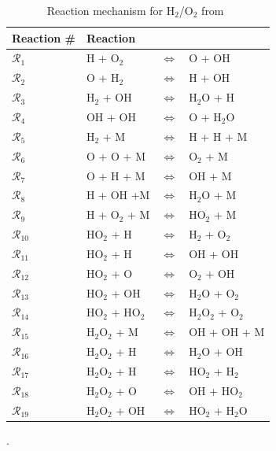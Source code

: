 \begin{table}[htbp]
\renewcommand*{\arraystretch}{1.2}
\begin{center}
\begin{tabular}{llll}
\toprule
Reaction \#     & Reaction &&\\
\bottomrule
$\mathcal{R}_1$ & H + O$_2$          & $\Longleftrightarrow$ & O + OH \\
$\mathcal{R}_2$ & O + H$_2$          & $\Longleftrightarrow$ & H + OH \\
$\mathcal{R}_3$ & H$_2$ + OH         & $\Longleftrightarrow$ & H$_2$O + H \\
$\mathcal{R}_4$ & OH + OH            & $\Longleftrightarrow$ & O + H$_2$O \\
$\mathcal{R}_5$ & H$_2$ + M          & $\Longleftrightarrow$ & H + H + M \\
$\mathcal{R}_6$ & O + O + M          & $\Longleftrightarrow$ & O$_2$ + M \\
$\mathcal{R}_7$ & O + H + M          & $\Longleftrightarrow$ & OH + M \\
$\mathcal{R}_8$ & H + OH +M          & $\Longleftrightarrow$ & H$_2$O + M \\
$\mathcal{R}_9$ & H + O$_2$ + M      & $\Longleftrightarrow$ & HO$_2$ + M \\
$\mathcal{R}_{10}$ & HO$_2$ + H      & $\Longleftrightarrow$ & H$_2$ + O$_2$ \\
$\mathcal{R}_{11}$ & HO$_2$ + H      & $\Longleftrightarrow$ & OH + OH \\
$\mathcal{R}_{12}$ & HO$_2$ + O      & $\Longleftrightarrow$ & O$_2$ + OH \\
$\mathcal{R}_{13}$ & HO$_2$ + OH     & $\Longleftrightarrow$ & H$_2$O + O$_2$ \\
$\mathcal{R}_{14}$ & HO$_2$ + HO$_2$ & $\Longleftrightarrow$ & H$_2$O$_2$ + O$_2$ \\
$\mathcal{R}_{15}$ & H$_2$O$_2$ + M  & $\Longleftrightarrow$ & OH + OH + M \\
$\mathcal{R}_{16}$ & H$_2$O$_2$ + H  & $\Longleftrightarrow$ & H$_2$O + OH \\
$\mathcal{R}_{17}$ & H$_2$O$_2$ + H  & $\Longleftrightarrow$ & HO$_2$ + H$_2$ \\
$\mathcal{R}_{18}$ & H$_2$O$_2$ + O  & $\Longleftrightarrow$ & OH + HO$_2$ \\
$\mathcal{R}_{19}$ & H$_2$O$_2$ + OH & $\Longleftrightarrow$ & HO$_2$ + H$_2$O \\
\bottomrule
\end{tabular}
\end{center}
\caption{Reaction mechanism for H$_2$/O$_2$ from~\cite{Yetter:1991}}.
\label{tab:kinetics}
\end{table}


